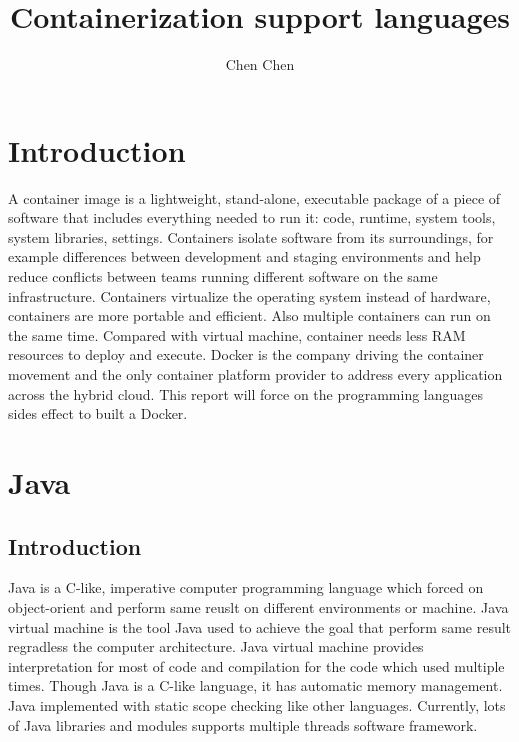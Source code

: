\documentclass[10pt, a4paper]{IEEEtran}
\begin{document}
    \title{Containerization support languages}
    \author{Chen Chen}
    \maketitle
    \section*{Introduction}
    A container image is a lightweight, stand-alone, executable package of a piece of software that includes everything needed to run it: code, runtime, system tools, system libraries, settings.  Containers isolate software from its surroundings, for example differences between development and staging environments and help reduce conflicts between teams running different software on the same infrastructure. Containers virtualize the operating system instead of hardware, containers are more portable and efficient.\cite{docker_2017} Also multiple containers can run on the same time. Compared with virtual machine, container needs less RAM resources to deploy and execute. Docker is the company driving the container movement and the only container platform provider to address every application across the hybrid cloud. This report will force on the programming languages sides effect to built a Docker.\\

    \section{Java}
    \subsection*{Introduction}
    Java is a C-like, imperative computer programming language which forced on object-orient and perform same reuslt on different environments or machine. Java virtual machine is the tool Java used to achieve the goal that perform same result regradless the computer architecture. Java virtual machine provides interpretation for most of code and compilation for the code which used multiple times. Though Java is a C-like language, it has automatic memory management. Java implemented with static scope checking like other languages. Currently, lots of Java libraries and modules supports multiple threads software framework.\\
\end{document}
